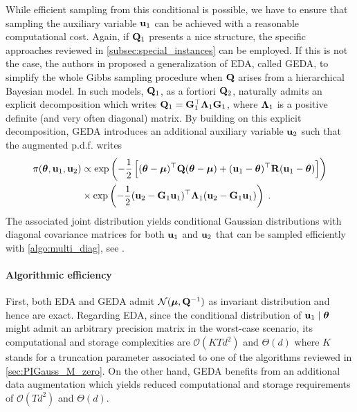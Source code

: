 \documentclass[nohypdvips,onefignum,onetabnum]{siamart171218}
\begin{document}
While efficient sampling from this conditional is possible, we have to ensure that sampling the auxiliary variable $\mathbf{u}_1$ can be achieved with a reasonable computational cost.
Again, if $\mathbf{Q}_1$ presents a nice structure, the specific approaches reviewed in \cref{subsec:special_instances} can be employed.
If this is not the case, the authors in \cite{Marnissi2018,Marnissi2019} proposed a generalization of EDA, called GEDA, to simplify the whole Gibbs sampling procedure when $\mathbf{Q}$ arises from a hierarchical Bayesian  model.
In such models, $\mathbf{Q}_1$, as a fortiori $\mathbf{Q}_2$, naturally admits an explicit decomposition which writes $\mathbf{Q}_1 = \mathbf{G}_1^{\top}\boldsymbol{\Lambda}_1\mathbf{G}_1$, where $\boldsymbol{\Lambda}_1$ is a positive definite (and very often diagonal) matrix.
By building on this explicit decomposition, GEDA introduces an additional auxiliary variable $\mathbf{u}_2$ such that the augmented p.d.f. writes
\begin{align}
  \pi(\Bs{\theta},\B{u}_1,\B{u}_2) &\propto \exp\pr{-\dfrac{1}{2}\br{(\Bs{\theta}-\Bs{\mu})^{\top}\B{Q}(\Bs{\theta}-\Bs{\mu}) + (\B{u}_1-\Bs{\theta})^{\top}\B{R}(\B{u}_1-\Bs{\theta})}} \nonumber \\
  &\times \exp\pr{-\dfrac{1}{2}(\B{u}_2-\B{G}_1\B{u}_1)^{\top}\B{\Lambda}_1(\B{u}_2-\B{G}_1\B{u}_1)}\eqsp. \label{eq:GEDA}
\end{align}
The associated joint distribution yields conditional Gaussian distributions with diagonal covariance matrices for both $\mathbf{u}_1$ and $\mathbf{u}_2$ that can be sampled efficiently with \cref{algo:multi_diag}, see .

\paragraph{Algorithmic efficiency}
First, both EDA and GEDA admit $\mathcal{N}(\boldsymbol{\mu},\mathbf{Q}^{-1})$ as invariant distribution and hence are exact.
Regarding EDA, since the conditional distribution of $\mathbf{u}_1\mid\boldsymbol{\theta}$ might admit an arbitrary precision matrix in the worst-case scenario, its computational and storage complexities are $\mathcal{O}(KTd^2)$ and $\Theta(d)$ where $K$ stands for a truncation parameter associated to one of the algorithms reviewed in \cref{sec:PIGauss_M_zero}.
On the other hand, GEDA benefits from an additional data augmentation which yields reduced computational and storage requirements of $\mathcal{O}(Td^2)$ and $\Theta(d)$.
\end{document}
